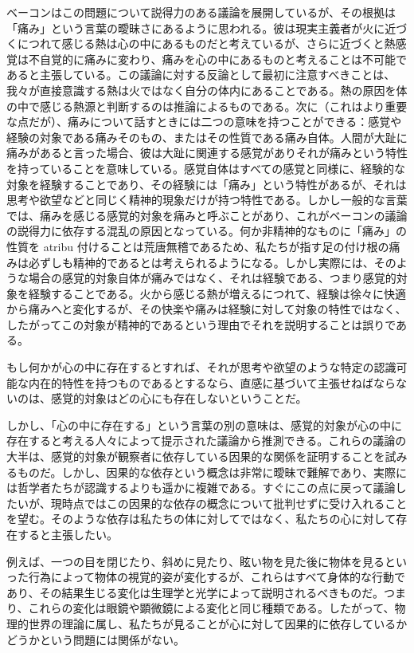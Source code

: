 \documentclass[a4paper,11pt,openany]{ltjsbook}
\begin{document}
ベーコンはこの問題について説得力のある議論を展開しているが、その根拠は「痛み」という言葉の曖昧さにあるように思われる。彼は現実主義者が火に近づくにつれて感じる熱は心の中にあるものだと考えているが、さらに近づくと熱感覚は不自覚的に痛みに変わり、痛みを心の中にあるものと考えることは不可能であると主張している。この議論に対する反論として最初に注意すべきことは、我々が直接意識する熱は火ではなく自分の体内にあることである。熱の原因を体の中で感じる熱源と判断するのは推論によるものである。次に（これはより重要な点だが）、痛みについて話すときには二つの意味を持つことができる：感覚や経験の対象である痛みそのもの、またはその性質である痛み自体。人間が大趾に痛みがあると言った場合、彼は大趾に関連する感覚がありそれが痛みという特性を持っていることを意味している。感覚自体はすべての感覚と同様に、経験的な対象を経験することであり、その経験には「痛み」という特性があるが、それは思考や欲望などと同じく精神的現象だけが持つ特性である。しかし一般的な言葉では、痛みを感じる感覚的対象を痛みと呼ぶことがあり、これがベーコンの議論の説得力に依存する混乱の原因となっている。何か非精神的なものに「痛み」の性質を atribu 付けることは荒唐無稽であるため、私たちが指す足の付け根の痛みは必ずしも精神的であるとは考えられるようになる。しかし実際には、そのような場合の感覚的対象自体が痛みではなく、それは経験である、つまり感覚的対象を経験することである。火から感じる熱が増えるにつれて、経験は徐々に快適から痛みへと変化するが、その快楽や痛みは経験に対して対象の特性ではなく、したがってこの対象が精神的であるという理由でそれを説明することは誤りである。

もし何かが心の中に存在するとすれば、それが思考や欲望のような特定の認識可能な内在的特性を持つものであるとするなら、直感に基づいて主張せねばならないのは、感覚的対象はどの心にも存在しないということだ。

しかし、「心の中に存在する」という言葉の別の意味は、感覚的対象が心の中に存在すると考える人々によって提示された議論から推測できる。これらの議論の大半は、感覚的対象が観察者に依存している因果的な関係を証明することを試みるものだ。しかし、因果的な依存という概念は非常に曖昧で難解であり、実際には哲学者たちが認識するよりも遥かに複雑である。すぐにこの点に戻って議論したいが、現時点ではこの因果的な依存の概念について批判せずに受け入れることを望む。そのような依存は私たちの体に対してではなく、私たちの心に対して存在すると主張したい。

例えば、一つの目を閉じたり、斜めに見たり、眩い物を見た後に物体を見るといった行為によって物体の視覚的姿が変化するが、これらはすべて身体的な行動であり、その結果生じる変化は生理学と光学によって説明されるべきものだ。つまり、これらの変化は眼鏡や顕微鏡による変化と同じ種類である。したがって、物理的世界の理論に属し、私たちが見ることが心に対して因果的に依存しているかどうかという問題には関係がない。
\end{document}
